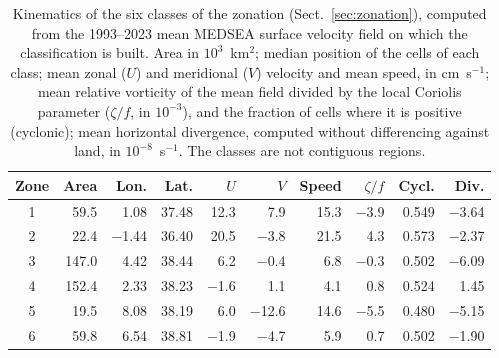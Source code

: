 \begin{table}[htbp]
\centering
\small
\caption{Kinematics of the six classes of the zonation (Sect.~\ref{sec:zonation}), computed from the 1993--2023 mean MEDSEA surface velocity field on which the classification is built. Area in $10^{3}$~km$^{2}$; median position of the cells of each class; mean zonal ($U$) and meridional ($V$) velocity and mean speed, in cm~s$^{-1}$; mean relative vorticity of the mean field divided by the local Coriolis parameter ($\zeta/f$, in $10^{-3}$), and the fraction of cells where it is positive (cyclonic); mean horizontal divergence, computed without differencing against land, in $10^{-8}$~s$^{-1}$. The classes are not contiguous regions.}
\label{tab:zones-kinematics}
\begin{tabular}{crrrrrrrrr}
\toprule
Zone & Area & Lon. & Lat. & $U$ & $V$ & Speed & $\zeta/f$ & Cycl. & Div. \\
\midrule
1 & 59.5 & 1.08 & 37.48 & 12.3 & 7.9 & 15.3 & $-$3.9 & 0.549 & $-$3.64 \\
2 & 22.4 & $-$1.44 & 36.40 & 20.5 & $-$3.8 & 21.5 & 4.3 & 0.573 & $-$2.37 \\
3 & 147.0 & 4.42 & 38.44 & 6.2 & $-$0.4 & 6.8 & $-$0.3 & 0.502 & $-$6.09 \\
4 & 152.4 & 2.33 & 38.23 & $-$1.6 & 1.1 & 4.1 & 0.8 & 0.524 & 1.45 \\
5 & 19.5 & 8.08 & 38.19 & 6.0 & $-$12.6 & 14.6 & $-$5.5 & 0.480 & $-$5.15 \\
6 & 59.8 & 6.54 & 38.81 & $-$1.9 & $-$4.7 & 5.9 & 0.7 & 0.502 & $-$1.90 \\
\bottomrule
\end{tabular}
\end{table}

